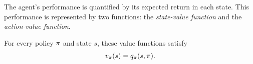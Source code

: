 





\vspace{-0.6cm}


The agent's performance is quantified by
its expected return in each state.
This performance is represented by 
two functions: the \textit{state-value function} and the \textit{action-value function}.





\vspace{-0.6cm}

For every policy $\pi$ and state $s$, these value functions satisfy
\begin{align}
\label{eq: relate v to q}
    v_{\pi}(s) = q_{\pi}(s, \pi) .
\end{align}

